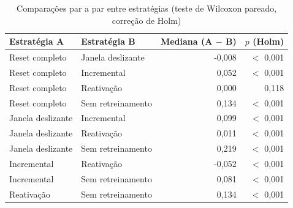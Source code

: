 \begin{table}[htbp]
\centering
\small
\caption{Comparações par a par entre estratégias (teste de Wilcoxon pareado, correção de Holm)}
\label{tab:wilcoxon}
\begin{tabular}{llrr}
\toprule
Estratégia A & Estratégia B & Mediana (A $-$ B) & $p$ (Holm) \\
\midrule
Reset completo & Janela deslizante & -0,008 & $<$ 0,001 \\
Reset completo & Incremental & 0,052 & $<$ 0,001 \\
Reset completo & Reativação & 0,000 & 0,118 \\
Reset completo & Sem retreinamento & 0,134 & $<$ 0,001 \\
Janela deslizante & Incremental & 0,099 & $<$ 0,001 \\
Janela deslizante & Reativação & 0,011 & $<$ 0,001 \\
Janela deslizante & Sem retreinamento & 0,219 & $<$ 0,001 \\
Incremental & Reativação & -0,052 & $<$ 0,001 \\
Incremental & Sem retreinamento & 0,081 & $<$ 0,001 \\
Reativação & Sem retreinamento & 0,134 & $<$ 0,001 \\
\bottomrule
\end{tabular}
\par\vspace{2pt}{\footnotesize Blocos pareados: as 120 streams (acurácia média dos três classificadores). Friedman: $\chi^2$ = 325,1, $p$ $<$ 0,001.}
\end{table}
